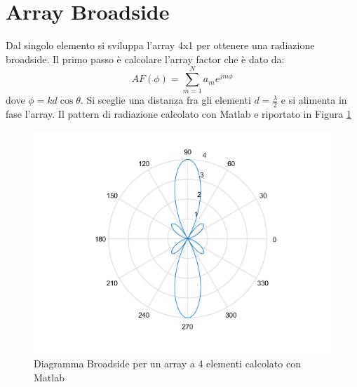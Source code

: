 \documentclass[twoside,twocolumn]{article}
\begin{document}
\section{Array Broadside}

Dal singolo elemento si sviluppa l'array 4x1 per ottenere una radiazione broadside.
Il primo passo è calcolare l'array factor che è dato da:
\begin{equation}
AF(\phi)=\sum_{m=1}^{N} a_{m} e^{jm \phi}
\end{equation}
dove $\phi=kd\cos\theta$.\newline
Si sceglie una distanza fra gli elementi  $d=\frac{\lambda}{2}$ e si alimenta in fase l'array.
Il pattern di radiazione calcolato con Matlab e riportato in Figura \ref{fig:Array4E_matlab}
\begin{figure}[h!]
  \includegraphics[width=\linewidth]{Array4E_matlab}
  \caption{Diagramma Broadside per un array a 4 elementi calcolato con Matlab}
  \label{fig:Array4E_matlab}
\end{figure}
\end{document}
